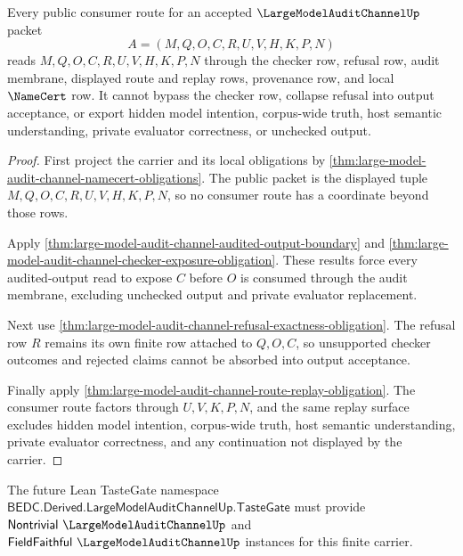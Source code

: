 \begin{theorem}
\label{thm:large-model-audit-channel-public-route-scope}
Every public consumer route for an accepted $\LargeModelAuditChannelUp$ packet
$$
A=(M,Q,O,C,R,U,V,H,K,P,N)
$$
reads $M,Q,O,C,R,U,V,H,K,P,N$ through the checker row, refusal row, audit membrane, displayed route and replay rows, provenance row, and local $\NameCert$ row. It cannot bypass the checker row, collapse refusal into output acceptance, or export hidden model intention, corpus-wide truth, host semantic understanding, private evaluator correctness, or unchecked output.
\end{theorem}
\begin{proof}
First project the carrier and its local obligations by \autoref{thm:large-model-audit-channel-namecert-obligations}. The public packet is the displayed tuple $M,Q,O,C,R,U,V,H,K,P,N$, so no consumer route has a coordinate beyond those rows.

Apply \autoref{thm:large-model-audit-channel-audited-output-boundary} and \autoref{thm:large-model-audit-channel-checker-exposure-obligation}. These results force every audited-output read to expose $C$ before $O$ is consumed through the audit membrane, excluding unchecked output and private evaluator replacement.

Next use \autoref{thm:large-model-audit-channel-refusal-exactness-obligation}. The refusal row $R$ remains its own finite row attached to $Q,O,C$, so unsupported checker outcomes and rejected claims cannot be absorbed into output acceptance.

Finally apply \autoref{thm:large-model-audit-channel-route-replay-obligation}. The consumer route factors through $U,V,K,P,N$, and the same replay surface excludes hidden model intention, corpus-wide truth, host semantic understanding, private evaluator correctness, and any continuation not displayed by the carrier.
\end{proof}



The future Lean TasteGate namespace $\mathsf{BEDC.Derived.LargeModelAuditChannelUp.TasteGate}$ must provide $\mathsf{Nontrivial}\ \LargeModelAuditChannelUp$ and $\mathsf{FieldFaithful}\ \LargeModelAuditChannelUp$ instances for this finite carrier.

